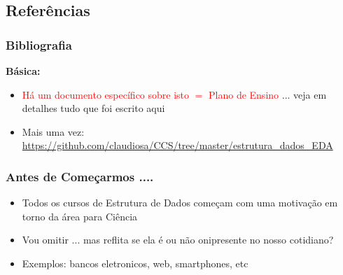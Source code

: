 
\subsection{Referências}  

\begin{frame}[allowframebreaks=0.9]
\frametitle{Bibliografia}  

\textbf{Básica:} 
\begin{itemize}

\item   \textcolor{red}{Há um documento específico sobre isto $=$ Plano de Ensino} ... veja em detalhes
tudo que foi escrito aqui

\item Mais uma vez: \url{https://github.com/claudiosa/CCS/tree/master/estrutura_dados_EDA}

\end{itemize}
\end{frame}

\begin{frame}[allowframebreaks=0.9]
\frametitle{Antes de Começarmos ....}  


\begin{itemize}

\item Todos os cursos de Estrutura de Dados começam com uma motivação em torno
 da área para Ciência   

\item Vou omitir ... mas reflita se ela é ou não onipresente no nosso cotidiano?

\item Exemplos: bancos eletronicos, web, smartphones, etc
\end{itemize}


\end{frame}



